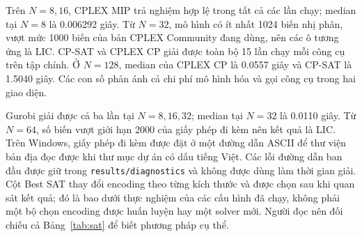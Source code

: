 Trên $N=8,16$, CPLEX MIP trả nghiệm hợp lệ trong tất cả các lần chạy; median tại $N=8$ là 0.006292 giây. Từ $N=32$, mô hình có ít nhất 1024 biến nhị phân, vượt mức 1000 biến của bản CPLEX Community đang dùng, nên các ô tương ứng là LIC. CP-SAT và CPLEX CP giải được toàn bộ 15 lần chạy mỗi công cụ trên tập chính. Ở $N=128$, median của CPLEX CP là 0.0557 giây và CP-SAT là 1.5040 giây. Các con số phản ánh cả chi phí mô hình hóa và gọi công cụ trong hai giao diện.

Gurobi giải được cả ba lần tại $N=8,16,32$; median tại $N=32$ là 0.0110 giây. Từ $N=64$, số biến vượt giới hạn 2000 của giấy phép đi kèm nên kết quả là LIC. Trên Windows, giấy phép đi kèm được đặt ở một đường dẫn ASCII để thư viện bản địa đọc được khi thư mục dự án có dấu tiếng Việt. Các lỗi đường dẫn ban đầu được giữ trong \texttt{results/diagnostics} và không được dùng làm thời gian giải. Cột Best SAT thay đổi encoding theo từng kích thước và được chọn sau khi quan sát kết quả; đó là bao dưới thực nghiệm của các cấu hình đã chạy, không phải một bộ chọn encoding được huấn luyện hay một solver mới. Người đọc nên đối chiếu cả Bảng~\ref{tab:sat} để biết phương pháp cụ thể.
